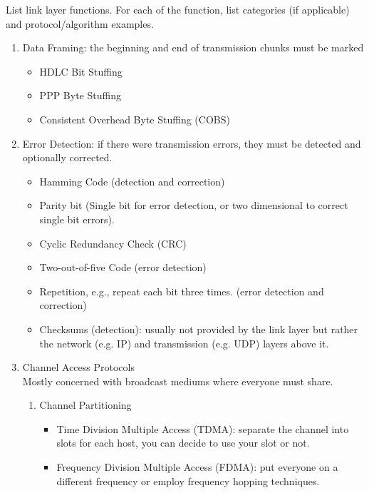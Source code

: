 \documentclass{report}
\begin{document}
\mktitle

\clearpage
\begin{problem}

List link layer functions.  For each of the function, list categories (if
applicable) and protocol/algorithm examples.

\begin{answer}{42em}
\begin{enumerate}
  \item Data Framing: the beginning and end of transmission chunks must be marked
    \begin{itemize}
      \item HDLC Bit Stuffing
      \item PPP Byte Stuffing
      \item Consistent Overhead Byte Stuffing (COBS)
    \end{itemize}

  \item Error Detection: if there were transmission errors, they must be detected
        and optionally corrected.
    \begin{itemize}
      \item Hamming Code (detection and correction)
      \item Parity bit (Single bit for error detection, or two
            dimensional to correct single bit errors).
      \item Cyclic Redundancy Check (CRC)
      \item Two-out-of-five Code (error detection)
      \item Repetition, e.g., repeat each bit three times. (error detection and
            correction)
      \item Checksums (detection): usually not provided by the link layer but
            rather the network (e.g. IP) and transmission (e.g. UDP) layers
            above it.
    \end{itemize}

  \item Channel Access Protocols \\
    Mostly concerned with broadcast mediums where everyone must share.
    \begin{enumerate}
      \item Channel Partitioning
        \begin{itemize}
          \item Time Division Multiple Access (TDMA): separate the channel
                into slots for each host, you can decide to use your slot or not.
          \item Frequency Division Multiple Access (FDMA): put everyone on a
                different frequency or employ frequency hopping techniques.
        \end{itemize}


\end{enumerate}
\end{enumerate}
\end{answer}
\end{problem}
\end{document}
